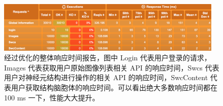 \begin{figure}
\centering
\includegraphics[width=108mm]{images/opt}
\caption{经过优化的整体响应时间报告，图中 Login 代表用户登录的请求， Images 代表获取用户原始图像列表相关 API 的响应时间，Swcs 代表用户对神经元结构进行操作的相关 API 的响应时间，SwcContent 代表用户获取结构脑胞体的响应时间。可以看出绝大多数响应时间都在 100 ms 一下，性能大大提升。}
\label{opt}
\end{figure}
